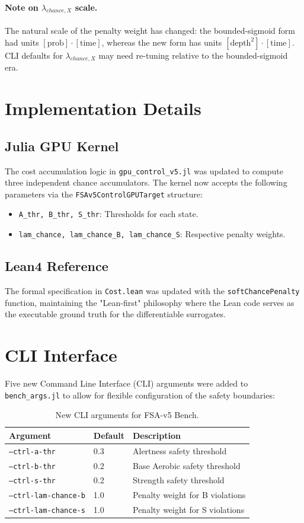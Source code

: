 \documentclass[11pt,a4paper]{article}
\begin{document}
\paragraph{Note on $\lambda_{chance,X}$ scale.} The natural scale of the penalty weight has changed: the bounded-sigmoid form had units $[\text{prob}] \cdot [\text{time}]$, whereas the new form has units $[\text{depth}^2] \cdot [\text{time}]$. CLI defaults for $\lambda_{chance,X}$ may need re-tuning relative to the bounded-sigmoid era.

\section{Implementation Details}

\subsection{Julia GPU Kernel}
The cost accumulation logic in \texttt{gpu\_control\_v5.jl} was updated to compute three independent chance accumulators. The kernel now accepts the following parameters via the \texttt{FSAv5ControlGPUTarget} structure:
\begin{itemize}
    \item \texttt{A\_thr, B\_thr, S\_thr}: Thresholds for each state.
    \item \texttt{lam\_chance, lam\_chance\_B, lam\_chance\_S}: Respective penalty weights.
\end{itemize}

\subsection{Lean4 Reference}
The formal specification in \texttt{Cost.lean} was updated with the \texttt{softChancePenalty} function, maintaining the "Lean-first" philosophy where the Lean code serves as the executable ground truth for the differentiable surrogates.

\section{CLI Interface}
Five new Command Line Interface (CLI) arguments were added to \texttt{bench\_args.jl} to allow for flexible configuration of the safety boundaries:

\begin{table}[h]
\centering
\begin{tabular}{@{}lll@{}}
\toprule
Argument & Default & Description \\
\midrule
\texttt{--ctrl-a-thr} & 0.3 & Alertness safety threshold \\
\texttt{--ctrl-b-thr} & 0.2 & Base Aerobic safety threshold \\
\texttt{--ctrl-s-thr} & 0.2 & Strength safety threshold \\
\texttt{--ctrl-lam-chance-b} & 1.0 & Penalty weight for B violations \\
\texttt{--ctrl-lam-chance-s} & 1.0 & Penalty weight for S violations \\
\bottomrule
\end{tabular}
\caption{New CLI arguments for FSA-v5 Bench.}
\end{table}
\end{document}
